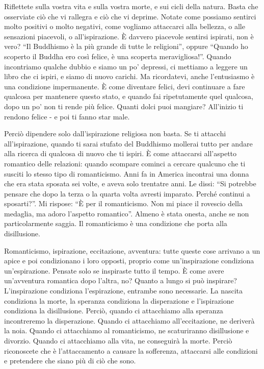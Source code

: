 Riflettete sulla vostra vita e sulla vostra morte, e sui cicli della
natura. Basta che osserviate ciò che vi rallegra e ciò che vi deprime.
Notate come possiamo sentirci molto positivi o molto negativi, come
vogliamo attaccarci alla bellezza, o alle sensazioni piacevoli, o
all'ispirazione. È davvero piacevole sentirsi ispirati, non è vero? ``Il
Buddhismo è la più grande di tutte le religioni'', oppure ``Quando ho
scoperto il Buddha ero così felice, è una scoperta meravigliosa!''.
Quando incontriamo qualche dubbio e siamo un po' depressi, ci mettiamo a
leggere un libro che ci ispiri, e siamo di nuovo carichi. Ma
ricordatevi, anche l'entusiasmo è una condizione impermanente. È come
diventare felici, devi continuare a fare qualcosa per mantenere questo
stato, e quando fai ripetutamente quel qualcosa, dopo un po' non ti
rende più felice. Quanti dolci puoi mangiare? All'inizio ti rendono
felice - e poi ti fanno star male.

Perciò dipendere solo dall'ispirazione religiosa non basta. Se ti
attacchi all'ispirazione, quando ti sarai stufato del Buddhismo mollerai
tutto per andare alla ricerca di qualcosa di nuovo che ti ispiri. È come
attaccarsi all'aspetto romantico delle relazioni: quando scompare
cominci a cercare qualcuno che ti susciti lo stesso tipo di
romanticismo. Anni fa in America incontrai una donna che era stata
sposata sei volte, e aveva solo trentatre anni. Le dissi: ``Si potrebbe
pensare che dopo la terza o la quarta volta avresti imparato. Perché
continui a sposarti?''. Mi rispose: ``È per il romanticismo. Non mi
piace il rovescio della medaglia, ma adoro l'aspetto romantico''. Almeno
è stata onesta, anche se non particolarmente saggia. Il romanticismo è
una condizione che porta alla disillusione.

Romanticismo, ispirazione, eccitazione, avventura: tutte queste cose
arrivano a un apice e poi condizionano i loro opposti, proprio come
un'inspirazione condiziona un'espirazione. Pensate solo se inspiraste
tutto il tempo. È come avere un'avventura romantica dopo l'altra, no?
Quanto a lungo si può inspirare? L'inspirazione condiziona
l'espirazione, entrambe sono necessarie. La nascita condiziona la morte,
la speranza condiziona la disperazione e l'ispirazione condiziona la
disillusione. Perciò, quando ci attacchiamo alla speranza incontreremo
la disperazione. Quando ci attacchiamo all'eccitazione, ne deriverà la
noia. Quando ci attacchiamo al romanticismo, ne scaturiranno
disillusione e divorzio. Quando ci attacchiamo alla vita, ne conseguirà
la morte. Perciò riconoscete che è l'attaccamento a causare la
sofferenza, attaccarsi alle condizioni e pretendere che siano più di ciò
che sono.

